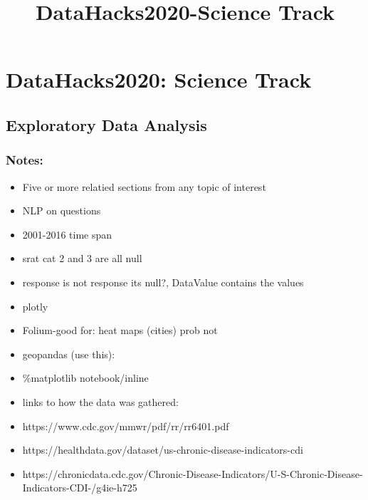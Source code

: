 \documentclass[11pt]{article}
\title{DataHacks2020-Science Track}
\begin{document}
    
    
    \maketitle
    
    

    
    \hypertarget{datahacks2020-science-track}{%
\section{DataHacks2020: Science
Track}\label{datahacks2020-science-track}}

    \hypertarget{exploratory-data-analysis}{%
\subsection{Exploratory Data Analysis}\label{exploratory-data-analysis}}

    \hypertarget{notes}{%
\subsubsection{Notes:}\label{notes}}

\begin{itemize}
\item
  Five or more relatied sections from any topic of interest
\item
  NLP on questions
\item
  2001-2016 time span
\item
  srat cat 2 and 3 are all null
\item
  response is not response its null?, DataValue contains the values
\item
  plotly
\item
  Folium-good for: heat maps (cities) prob not
\item
  geopandas (use this):
\item
  \%matplotlib notebook/inline
\item
  links to how the data was gathered:\\
\item
  https://www.cdc.gov/mmwr/pdf/rr/rr6401.pdf\\
\item
  https://healthdata.gov/dataset/us-chronic-disease-indicators-cdi\\
\item
  https://chronicdata.cdc.gov/Chronic-Disease-Indicators/U-S-Chronic-Disease-Indicators-CDI-/g4ie-h725
\end{itemize}
\end{document}
